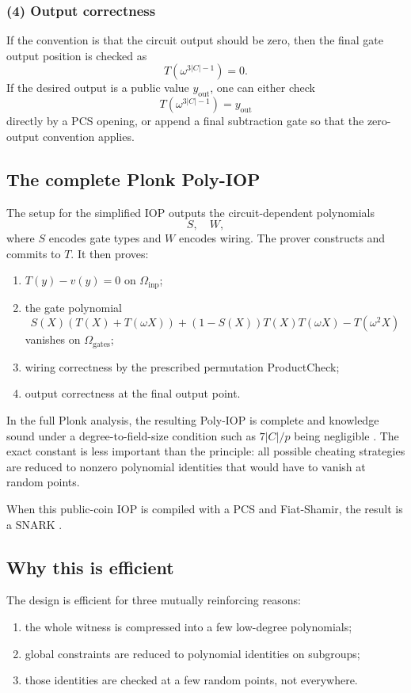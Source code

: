\documentclass[11pt]{article}
\begin{document}
\subsubsection*{(4) Output correctness}

If the convention is that the circuit output should be zero, then the final gate output position is checked as
\[
    T(\omega^{3|C|-1})=0.
\]
If the desired output is a public value $y_{\mathrm{out}}$, one can either check
\[
    T(\omega^{3|C|-1})=y_{\mathrm{out}}
\]
directly by a PCS opening, or append a final subtraction gate so that the zero-output convention applies.

\subsection{The complete Plonk Poly-IOP}

The setup for the simplified IOP outputs the circuit-dependent polynomials
\[
    S,\quad W,
\]
where $S$ encodes gate types and $W$ encodes wiring. The prover constructs and commits to $T$. It then proves:
\begin{enumerate}[leftmargin=2em]
    \item $T(y)-v(y)=0$ on $\Omega_{\mathrm{inp}}$;
    \item the gate polynomial
    \[
    S(X)(T(X)+T(\omega X))+(1-S(X))T(X)T(\omega X)-T(\omega^2X)
    \]
    vanishes on $\Omega_{\mathrm{gates}}$;
    \item wiring correctness by the prescribed permutation ProductCheck;
    \item output correctness at the final output point.
\end{enumerate}

In the full Plonk analysis, the resulting Poly-IOP is complete and knowledge sound under a degree-to-field-size condition such as $7|C|/p$ being negligible \cite{GabizonWilliamsonCiobotaru2019}. The exact constant is less important than the principle: all possible cheating strategies are reduced to nonzero polynomial identities that would have to vanish at random points.

When this public-coin IOP is compiled with a PCS and Fiat-Shamir, the result is a SNARK \cite{FiatShamir1986}.

\subsection{Why this is efficient}

The design is efficient for three mutually reinforcing reasons:
\begin{enumerate}[leftmargin=2em]
    \item the whole witness is compressed into a few low-degree polynomials;
    \item global constraints are reduced to polynomial identities on subgroups;
    \item those identities are checked at a few random points, not everywhere.
\end{enumerate}
\end{document}
